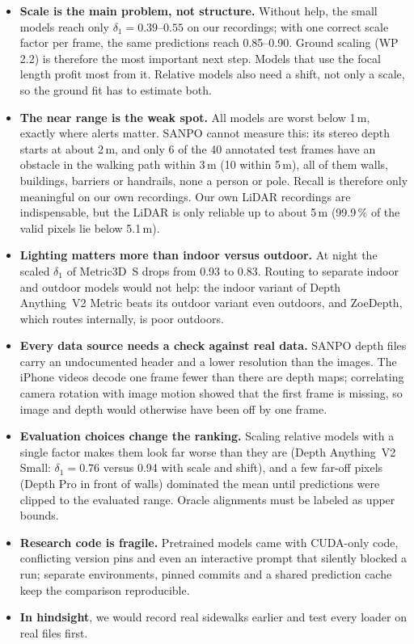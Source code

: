 \documentclass[11pt,a4paper]{article}
\begin{document}
\begin{itemize}[leftmargin=1.2em]
\item \textbf{Scale is the main problem, not structure.} Without help, the small models reach only
  $\delta_1 = 0.39$--$0.55$ on our recordings; with one correct scale factor per frame, the same predictions
  reach 0.85--0.90. Ground scaling (WP 2.2) is therefore the most important next step. Models that use the
  focal length profit most from it. Relative models also need a shift, not only a scale, so the ground fit has
  to estimate both.
\item \textbf{The near range is the weak spot.} All models are worst below 1\,m, exactly where alerts matter.
  SANPO cannot measure this: its stereo depth starts at about 2\,m, and only 6 of the 40 annotated test frames
  have an obstacle in the walking path within 3\,m (10 within 5\,m), all of them walls, buildings, barriers or handrails, none a person
  or pole. Recall is therefore only meaningful on our own recordings. Our own LiDAR recordings are indispensable, but the LiDAR is
  only reliable up to about 5\,m (99.9\,\% of the valid pixels lie below 5.1\,m).
\item \textbf{Lighting matters more than indoor versus outdoor.} At night the scaled $\delta_1$ of Metric3D~S
  drops from 0.93 to 0.83. Routing to separate indoor and outdoor models would not help: the indoor variant of
  Depth Anything~V2 Metric beats its outdoor variant even outdoors, and ZoeDepth, which routes internally, is
  poor outdoors.
\item \textbf{Every data source needs a check against real data.} SANPO depth files carry an undocumented
  header and a lower resolution than the images. The iPhone videos decode one frame fewer than there are depth
  maps; correlating camera rotation with image motion showed that the first frame is missing, so image and
  depth would otherwise have been off by one frame.
\item \textbf{Evaluation choices change the ranking.} Scaling relative models with a single factor makes them
  look far worse than they are (Depth Anything~V2 Small: $\delta_1 = 0.76$ versus 0.94 with scale and shift), and a few far-off pixels
  (Depth Pro in front of walls) dominated the mean until predictions were clipped to the evaluated range.
  Oracle alignments must be labeled as upper bounds.
\item \textbf{Research code is fragile.} Pretrained models came with CUDA-only code, conflicting version pins
  and even an interactive prompt that silently blocked a run; separate environments, pinned commits and a
  shared prediction cache keep the comparison reproducible.
\item \textbf{In hindsight}, we would record real sidewalks earlier and test every loader on real files first.
\end{itemize}
\end{document}
